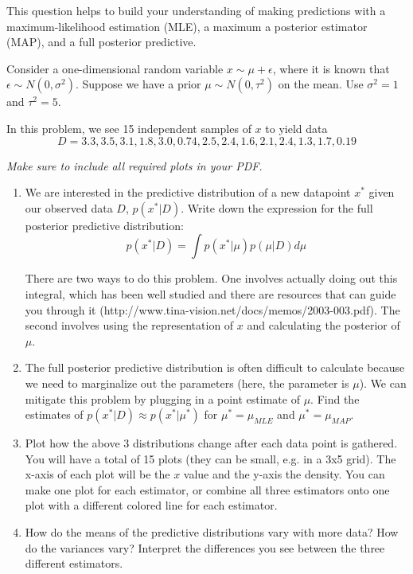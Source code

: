 \documentclass[submit]{harvardml}
\begin{document}
\begin{problem}

  This question helps to build your understanding of making
  predictions with a maximum-likelihood estimation (MLE), a maximum a
  posterior estimator (MAP), and a full posterior predictive.

  Consider a one-dimensional random variable $x \sim \mu + \epsilon$,
  where it is known that $\epsilon \sim N(0,\sigma^2)$.  Suppose we
  have a prior $\mu \sim N(0,\tau^2)$ on the mean.  Use $\sigma^2 = 1$
  and $\tau^2 = 5$.  

  In this problem, we see 15 independent samples of $x$ to yield data
  $$D = 3.3, 3.5, 3.1, 1.8, 3.0, 0.74, 2.5, 2.4, 1.6, 2.1, 2.4, 1.3, 1.7, 0.19$$
    
  \textit{Make sure to include all required plots in your PDF.}

\begin{enumerate}

\item We are interested in the predictive distribution of a new datapoint $x^*$ given our observed data $D$, $p(x^*|D)$.
  Write down the expression for the full posterior predictive distribution: $$p(x^*|D) = \int p(x^*|\mu)p(\mu|D) d\mu$$
  
  There are two ways to do this problem. One involves actually doing out this integral, which has been well studied and there are resources that can guide you through it (http://www.tina-vision.net/docs/memos/2003-003.pdf). The second involves using the representation of $x$ and calculating the posterior of $\mu$.
  
 \item The full posterior predictive distribution is often difficult to calculate because we need to marginalize out the parameters (here, the parameter is $\mu$). We can mitigate this problem by plugging in a point estimate of $\mu$. Find the estimates of $p(x^*|D) \approx p(x^*|\mu^*)$ for $\mu^* = \mu_{MLE}$ and $\mu^* = \mu_{MAP}$.
   
\item Plot how the above 3 distributions change after each data point is
  gathered.  You will have a total of 15 plots (they can be small,
  e.g. in a 3x5 grid).  The x-axis of each plot will be the $x$ value
  and the y-axis the density.  You can make one plot for each
  estimator, or combine all three estimators onto one plot with a
  different colored line for each estimator.
  
    
\item How do the means of the predictive distributions vary with more
  data?  How do the variances vary?  Interpret the differences you see
  between the three different estimators.
  

\end{enumerate}
\end{problem}
\end{document}
